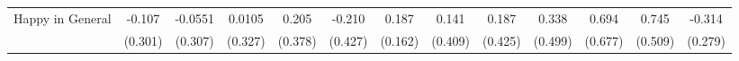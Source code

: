 {\begin{tabular}{l*{12}{c}}
\addlinespace
Happy in General&      -0.107         &     -0.0551         &      0.0105         &       0.205         &      -0.210         &       0.187         &       0.141         &       0.187         &       0.338         &       0.694         &       0.745         &      -0.314         \\
            &     (0.301)         &     (0.307)         &     (0.327)         &     (0.378)         &     (0.427)         &     (0.162)         &     (0.409)         &     (0.425)         &     (0.499)         &     (0.677)         &     (0.509)         &     (0.279)         \\
\bottomrule
\end{tabular}
}
